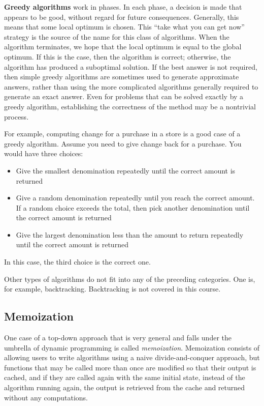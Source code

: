 \documentclass[justified, sixbynine]{tufte-book}
\theoremstyle{plain}%
\newtheorem * {corollary}{Corollary}
\theoremstyle{definition}
\theoremstyle{remark}
\newtheorem * {remark}{Remark}
\newtheorem * {note}{Note}
\begin{document}
\begin{fullwidth}

{\bf Greedy algorithms}
 work in phases. In each phase, a decision is made
that appears to be good, without regard for future consequences. Generally, 
this means that some local optimum is chosen. This ``take what you can get
now'' strategy is the source of the name for this class of algorithms. When
the algorithm terminates, we hope that the local optimum is equal to the
global optimum. If this is the case, then the algorithm is correct;
otherwise, the algorithm has produced a suboptimal solution. If the best
answer is not required, then simple greedy algorithms are sometimes used to
generate approximate answers, rather than using the more complicated
algorithms generally required to generate an exact answer. Even for problems
that can be solved exactly by a greedy algorithm, establishing the
correctness of the method may be a nontrivial process.

For example, computing change for a purchase in a store is a good case of a greedy algorithm.  Assume you need to give change back for a purchase.  You would have three choices:
\begin{itemize}
\item Give the smallest denomination repeatedly until the correct amount is returned

\item Give a random denomination repeatedly until you reach the correct amount. If a random choice exceeds the total, then pick another denomination until the correct amount is returned

\item Give the largest denomination less than the amount to return repeatedly until the correct amount is returned
\end{itemize}

In this case, the third choice is the correct one.

Other types of algorithms do not fit into any of the preceding
categories. One is, for example, backtracking. Backtracking is not covered
in this course.

\goodbreak\subsection{Memoization}


One case of a top-down approach that is very general and falls under the umbrella of dynamic programming is called {\it memoization}. Memoization consists of allowing users to write algorithms using a naive divide-and-conquer approach, but functions that may be called more than once are modified so that their output is cached, and if they are called again with the same initial state, instead of the algorithm running again, the output is retrieved from the cache and returned without any computations.


\end{fullwidth}
\end{document}
